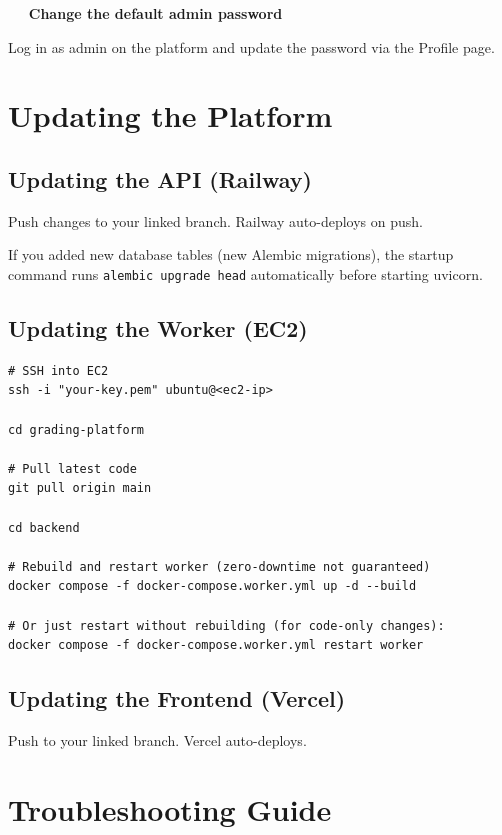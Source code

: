 \documentclass[12pt,a4paper]{article}
\newcounter{stepnum}
\newcommand{\step}[1]{%
  \stepcounter{stepnum}%
  \vspace{8pt}%
  \noindent\colorbox{setupCyan}{\color{white}\bfseries\small\ \thestepnum\ }%
  \hspace{4pt}\textbf{#1}%
  \par\vspace{2pt}%
}
\begin{document}
\step{Change the default admin password}
Log in as admin on the platform and update the password via the Profile page.

\section{Updating the Platform}

\subsection{Updating the API (Railway)}

Push changes to your linked branch. Railway auto-deploys on push.

If you added new database tables (new Alembic migrations), the startup command runs \texttt{alembic upgrade head} automatically before starting uvicorn.

\subsection{Updating the Worker (EC2)}

\begin{lstlisting}[style=terminal]
# SSH into EC2
ssh -i "your-key.pem" ubuntu@<ec2-ip>

cd grading-platform

# Pull latest code
git pull origin main

cd backend

# Rebuild and restart worker (zero-downtime not guaranteed)
docker compose -f docker-compose.worker.yml up -d --build

# Or just restart without rebuilding (for code-only changes):
docker compose -f docker-compose.worker.yml restart worker
\end{lstlisting}

\subsection{Updating the Frontend (Vercel)}

Push to your linked branch. Vercel auto-deploys.

\section{Troubleshooting Guide}
\end{document}
